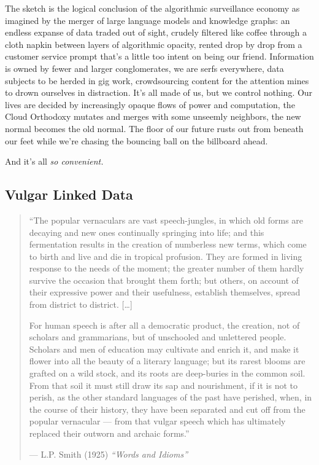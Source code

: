 The sketch is the logical conclusion of the algorithmic surveillance
economy as imagined by the merger of large language models and knowledge
graphs: an endless expanse of data traded out of sight, crudely filtered
like coffee through a cloth napkin between layers of algorithmic
opacity, rented drop by drop from a customer service prompt that's a
little too intent on being our friend. Information is owned by fewer and
larger conglomerates, we are serfs everywhere, data subjects to be
herded in gig work, crowdsourcing content for the attention mines to
drown ourselves in distraction. It's all made of us, but we control
nothing. Our lives are decided by increasingly opaque flows of power and
computation, the Cloud Orthodoxy mutates and merges with some unseemly
neighbors, the new normal becomes the old normal. The floor of our
future rusts out from beneath our feet while we're chasing the bouncing
ball on the billboard ahead.

And it's all \emph{so convenient.}

\hypertarget{vulgar-linked-data}{%
\subsection{Vulgar Linked Data}\label{vulgar-linked-data}}

\begin{quote}
``The popular vernaculars are vast speech-jungles, in which old forms
are decaying and new ones continually springing into life; and this
fermentation results in the creation of numberless new terms, which come
to birth and live and die in tropical profusion. They are formed in
living response to the needs of the moment; the greater number of them
hardly survive the occasion that brought them forth; but others, on
account of their expressive power and their usefulness, establish
themselves, spread from district to district. {[}\ldots{]}

For human speech is after all a democratic product, the creation, not of
scholars and grammarians, but of unschooled and unlettered people.
Scholars and men of education may cultivate and enrich it, and make it
flower into all the beauty of a literary language; but its rarest blooms
are grafted on a wild stock, and its roots are deep-buries in the common
soil. From that soil it must still draw its sap and nourishment, if it
is not to perish, as the other standard languages of the past have
perished, when, in the course of their history, they have been separated
and cut off from the popular vernacular --- from that vulgar speech
which has ultimately replaced their outworn and archaic forms.''

--- L.P. Smith (1925) \emph{``Words and Idioms''} \cite{smithWordsIdiomsStudies1925} 
\end{quote}

